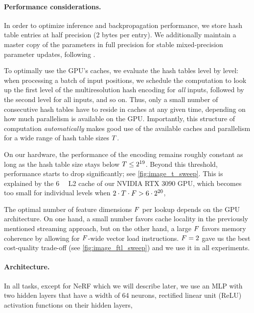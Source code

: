 \documentclass[acmtog,authorversion]{acmart}
\begin{document}
\paragraph{Performance considerations.}
In order to optimize inference and backpropagation performance, we store hash table entries at half precision (2 bytes per entry).
We additionally maintain a master copy of the parameters in full precision for stable mixed-precision parameter updates, following \citet{micikevicius2018mixed}.

To optimally use the GPU's caches, we evaluate the hash tables level by level: when processing a batch of input positions, we schedule the computation to look up the first level of the multiresolution hash encoding for \emph{all} inputs, followed by the second level for all inputs, and so on.
Thus, only a small number of consecutive hash tables have to reside in caches at any given time, depending on how much parallelism is available on the GPU.\@
Importantly, this structure of computation \emph{automatically} makes good use of the available caches and parallelism for a wide range of hash table sizes $T$.

On our hardware, the performance of the encoding remains roughly constant as long as the hash table size stays below ${T \leq 2^{19}}$.
Beyond this threshold, performance starts to drop significantly; see \autoref{fig:image_t_sweep}.
This is explained by the \SI{6}{\mega\byte} L2 cache of our NVIDIA RTX 3090 GPU, which becomes too small for individual levels when $2 \cdot T \cdot F > 6 \cdot 2^{20}$, 

The optimal number of feature dimensions $F$ per lookup depends on the GPU architecture.
On one hand, a small number favors cache locality in the previously mentioned streaming approach, but on the other hand, a large $F$ favors memory coherence by allowing for $F$-wide vector load instructions.
${F=2}$ gave us the best cost-quality trade-off (see \autoref{fig:image_ftl_sweep}) and we use it in all experiments.

\paragraph{Architecture.}
In all tasks, except for NeRF which we will describe later, we use an MLP with two hidden layers that have a width of \num{64} neurons, rectified linear unit (ReLU) activation functions on their hidden layers, 
\end{document}
